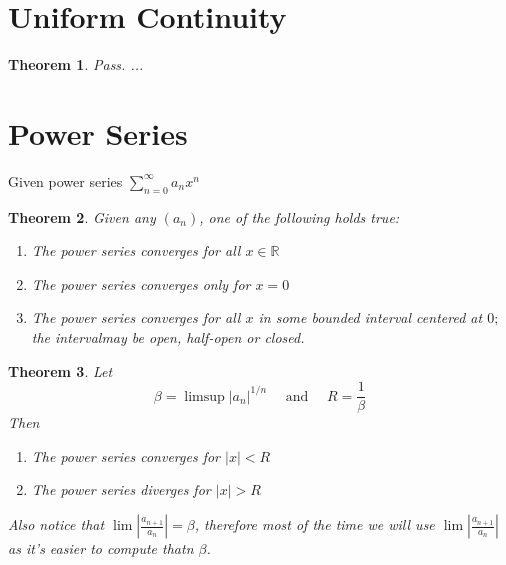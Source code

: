 \documentclass[12pt]{article}
\newtheorem{theorem}{Theorem}[section]
\begin{document}
\section{Uniform Continuity}
\begin{theorem}
	Pass. ...
\end{theorem}
\section{Power Series}
Given power series $\sum _ { n = 0 } ^ { \infty } a _ { n } x ^ { n }$
\begin{theorem}
Given any $(a_n)$, one of the following holds true:
\begin{enumerate}
	\item The power series converges for all $x \in \mathbb{R}$
	\item The power series converges only for $x = 0$
	\item The power series converges for all $x$ in some bounded interval centered at $0 ;$ the intervalmay be open, half-open or closed.
\end{enumerate}
\end{theorem}

\begin{theorem}
	Let $$
	\beta = \limsup \left| a _ { n } \right| ^ { 1 / n } \quad \text { and } \quad R = \frac { 1 } { \beta }
	$$
	Then
	\begin{enumerate}
		\item The power series converges for  $|x| < R$
		\item The power series diverges for $|x| > R$
	\end{enumerate}
	
	Also notice that $\lim \left| \frac { a _ { n + 1 } } { a _ { n } } \right| = \beta$, therefore most of the time we will use $\lim \left| \frac { a _ { n + 1 } } { a _ { n } } \right|$ as it's easier to compute thatn $\beta$.
\end{theorem}
\end{document}
